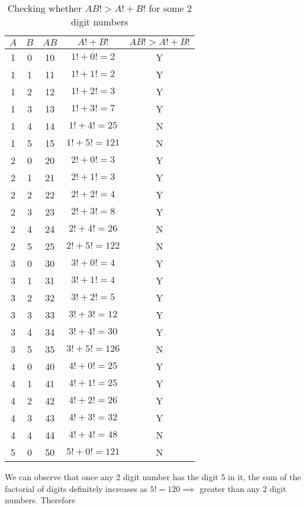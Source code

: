 \begin{table}[ht!]
    \centering
    \begin{tabular}{|| c | c | c | c | c ||}
        \hline
         \textbf{$A$} & \textbf{$B$} & \textbf{$AB$} & \textbf{$A! + B!$} & \textbf{$AB! > A! + B!$}  \\
        \hline
         1 & 0 & 10 & $1! + 0! = 2$ & Y \\
         1 & 1 & 11 & $1! + 1! = 2$ & Y \\
         1 & 2 & 12 & $1! + 2! = 3$ & Y \\
         1 & 3 & 13 & $1! + 3! = 7$ & Y \\
         1 & 4 & 14 & $1! + 4! = 25$ & N \\
         1 & 5 & 15 & $1! + 5! = 121$ & N \\
         2 & 0 & 20 & $2! + 0! = 3$ & Y \\
         2 & 1 & 21 & $2! + 1! = 3$ & Y \\
         2 & 2 & 22 & $2! + 2! = 4$ & Y \\
         2 & 3 & 23 & $2! + 3! = 8$ & Y \\
         2 & 4 & 24 & $2! + 4! = 26$ & N \\
         2 & 5 & 25 & $2! + 5! = 122$ & N \\
         3 & 0 & 30 & $3! + 0! = 4$ & Y \\
         3 & 1 & 31 & $3! + 1! = 4$ & Y \\
         3 & 2 & 32 & $3! + 2! = 5$ & Y \\
         3 & 3 & 33 & $3! + 3! = 12$ & Y \\
         3 & 4 & 34 & $3! + 4! = 30$ & Y \\
         3 & 5 & 35 & $3! + 5! = 126$ & N \\
         4 & 0 & 40 & $4! + 0! = 25$ & Y \\
         4 & 1 & 41 & $4! + 1! = 25$ & Y \\
         4 & 2 & 42 & $4! + 2! = 26$ & Y \\
         4 & 3 & 43 & $4! + 3! = 32$ & Y \\
         4 & 4 & 44 & $4! + 4! = 48$ & N \\
         5 & 0 & 50 & $5! + 0! = 121$ & N \\
        \hline
    \end{tabular}
    \caption{Checking whether $AB! > A! + B!$ for some 2 digit numbers}
\end{table}

We can observe that once any 2 digit number has the digit 5 in it, the sum of the factorial of digits definitely increases as $5! = 120 \implies $ greater than any 2 digit numbers. Therefore

